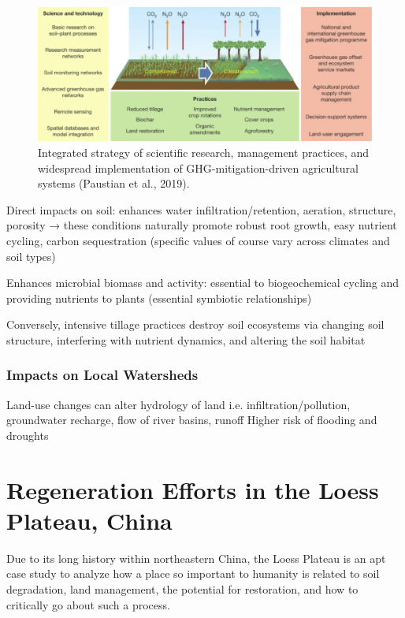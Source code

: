 \documentclass{book}\usepackage{knitr}
\begin{document}
\begin{figure}
\includegraphics[width=\linewidth]{images/land-use/Climate-Smart-Soils.png}
\caption{Integrated strategy of scientific research, management practices, and widespread implementation of GHG-mitigation-driven agricultural systems (Paustian et al., 2019).}
\label{fig:Climate-Smart-Soils}
\end{figure}

Direct impacts on soil: enhances water infiltration/retention, aeration, structure, porosity → these conditions naturally promote robust root growth, easy nutrient cycling, carbon sequestration (specific values of course vary across climates and soil types)

Enhances microbial biomass and activity: essential to biogeochemical cycling and providing nutrients to plants (essential symbiotic relationships)

Conversely, intensive tillage practices destroy soil ecosystems via changing soil structure, interfering with nutrient dynamics, and altering the soil habitat

\subsubsection{Impacts on Local Watersheds}
Land-use changes can alter hydrology of land i.e. infiltration/pollution, groundwater recharge, flow of river basins, runoff
Higher risk of flooding and droughts

\section{Regeneration Efforts in the Loess Plateau, China}

Due to its long history within northeastern China, the Loess Plateau is an apt case study to analyze how a place so important to humanity is related to soil degradation, land management, the potential for restoration, and how to critically go about such a process.
\end{document}
